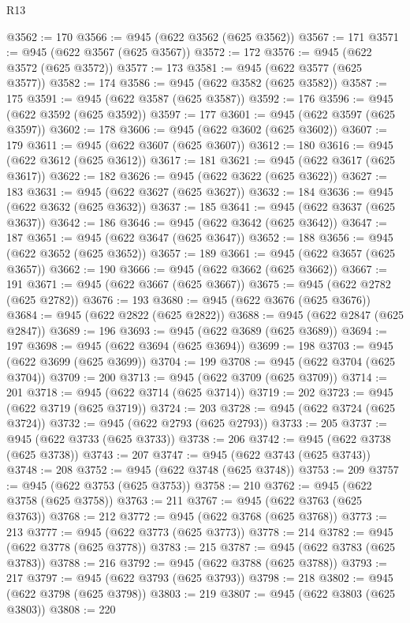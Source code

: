 \begin{lexlean}{R13}
\begin{coremodule}
@3562 := 170
@3566 := @945 (@622 @3562 (@625 @3562))
@3567 := 171
@3571 := @945 (@622 @3567 (@625 @3567))
@3572 := 172
@3576 := @945 (@622 @3572 (@625 @3572))
@3577 := 173
@3581 := @945 (@622 @3577 (@625 @3577))
@3582 := 174
@3586 := @945 (@622 @3582 (@625 @3582))
@3587 := 175
@3591 := @945 (@622 @3587 (@625 @3587))
@3592 := 176
@3596 := @945 (@622 @3592 (@625 @3592))
@3597 := 177
@3601 := @945 (@622 @3597 (@625 @3597))
@3602 := 178
@3606 := @945 (@622 @3602 (@625 @3602))
@3607 := 179
@3611 := @945 (@622 @3607 (@625 @3607))
@3612 := 180
@3616 := @945 (@622 @3612 (@625 @3612))
@3617 := 181
@3621 := @945 (@622 @3617 (@625 @3617))
@3622 := 182
@3626 := @945 (@622 @3622 (@625 @3622))
@3627 := 183
@3631 := @945 (@622 @3627 (@625 @3627))
@3632 := 184
@3636 := @945 (@622 @3632 (@625 @3632))
@3637 := 185
@3641 := @945 (@622 @3637 (@625 @3637))
@3642 := 186
@3646 := @945 (@622 @3642 (@625 @3642))
@3647 := 187
@3651 := @945 (@622 @3647 (@625 @3647))
@3652 := 188
@3656 := @945 (@622 @3652 (@625 @3652))
@3657 := 189
@3661 := @945 (@622 @3657 (@625 @3657))
@3662 := 190
@3666 := @945 (@622 @3662 (@625 @3662))
@3667 := 191
@3671 := @945 (@622 @3667 (@625 @3667))
@3675 := @945 (@622 @2782 (@625 @2782))
@3676 := 193
@3680 := @945 (@622 @3676 (@625 @3676))
@3684 := @945 (@622 @2822 (@625 @2822))
@3688 := @945 (@622 @2847 (@625 @2847))
@3689 := 196
@3693 := @945 (@622 @3689 (@625 @3689))
@3694 := 197
@3698 := @945 (@622 @3694 (@625 @3694))
@3699 := 198
@3703 := @945 (@622 @3699 (@625 @3699))
@3704 := 199
@3708 := @945 (@622 @3704 (@625 @3704))
@3709 := 200
@3713 := @945 (@622 @3709 (@625 @3709))
@3714 := 201
@3718 := @945 (@622 @3714 (@625 @3714))
@3719 := 202
@3723 := @945 (@622 @3719 (@625 @3719))
@3724 := 203
@3728 := @945 (@622 @3724 (@625 @3724))
@3732 := @945 (@622 @2793 (@625 @2793))
@3733 := 205
@3737 := @945 (@622 @3733 (@625 @3733))
@3738 := 206
@3742 := @945 (@622 @3738 (@625 @3738))
@3743 := 207
@3747 := @945 (@622 @3743 (@625 @3743))
@3748 := 208
@3752 := @945 (@622 @3748 (@625 @3748))
@3753 := 209
@3757 := @945 (@622 @3753 (@625 @3753))
@3758 := 210
@3762 := @945 (@622 @3758 (@625 @3758))
@3763 := 211
@3767 := @945 (@622 @3763 (@625 @3763))
@3768 := 212
@3772 := @945 (@622 @3768 (@625 @3768))
@3773 := 213
@3777 := @945 (@622 @3773 (@625 @3773))
@3778 := 214
@3782 := @945 (@622 @3778 (@625 @3778))
@3783 := 215
@3787 := @945 (@622 @3783 (@625 @3783))
@3788 := 216
@3792 := @945 (@622 @3788 (@625 @3788))
@3793 := 217
@3797 := @945 (@622 @3793 (@625 @3793))
@3798 := 218
@3802 := @945 (@622 @3798 (@625 @3798))
@3803 := 219
@3807 := @945 (@622 @3803 (@625 @3803))
@3808 := 220

\end{coremodule}
\end{lexlean}
